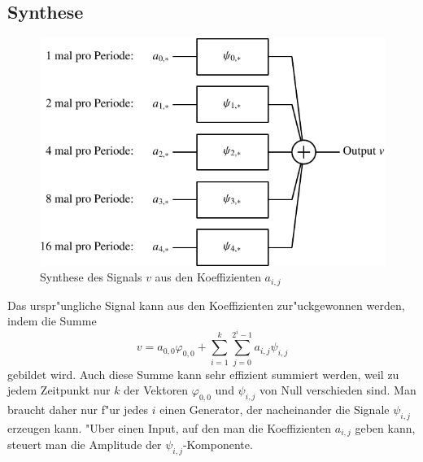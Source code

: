 \subsection{Synthese}
\begin{figure}
\begin{center}
\includegraphics[width=0.8\hsize]{images/signal-3}
\end{center}
\caption{Synthese des Signals $v$ aus den Koeffizienten $a_{i,j}$
\label{waveletsynthesis}}
\end{figure}
Das urspr"ungliche Signal kann aus den Koeffizienten zur"uckgewonnen werden,
indem die Summe
$$
v=a_{0,0}\varphi_{0,0}+\sum_{i=1}^k\sum_{j=0}^{2^i-1}a_{i,j}\psi_{i,j}
$$
gebildet wird. 
Auch diese Summe kann sehr effizient summiert werden, weil zu jedem
Zeitpunkt nur $k$ der Vektoren $\varphi_{0,0}$ und $\psi_{i,j}$
von Null verschieden sind.
Man braucht daher nur f"ur jedes $i$ einen Generator, der
nacheinander die Signale $\psi_{i,j}$ erzeugen kann. "Uber
einen Input, auf den man die Koeffizienten $a_{i,j}$ geben
kann, steuert man die Amplitude der $\psi_{i,j}$-Komponente.
